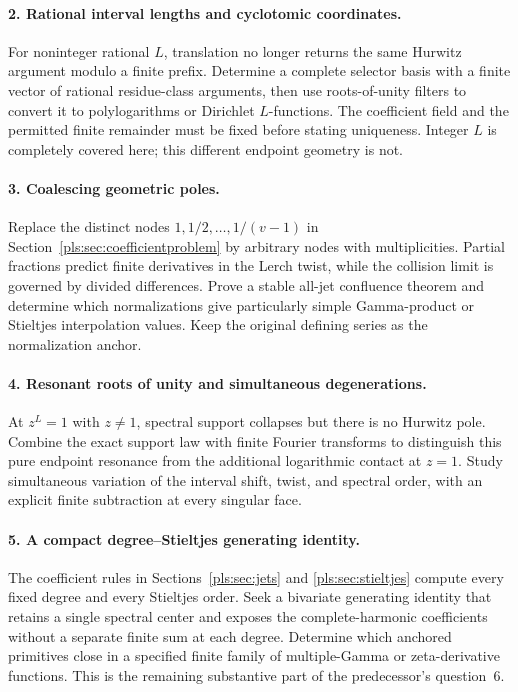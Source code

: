 \documentclass[11pt,letterpaper]{article}
\numberwithin{equation}{section}
\theoremstyle{definition}
\theoremstyle{remark}\newtheorem{remark}[theorem]{Remark}
\begin{document}
\paragraph{2. Rational interval lengths and cyclotomic coordinates.}
For noninteger rational $L$, translation no longer returns the same
Hurwitz argument modulo a finite prefix. Determine a complete selector
basis with a finite vector of rational residue-class arguments, then
use roots-of-unity filters to convert it to polylogarithms or Dirichlet
$L$-functions. The coefficient field and the permitted finite remainder
must be fixed before stating uniqueness. Integer $L$ is completely
covered here; this different endpoint geometry is not.

\paragraph{3. Coalescing geometric poles.}
Replace the distinct nodes $1,1/2,\ldots,1/(v-1)$ in
Section~\ref{pls:sec:coefficientproblem} by arbitrary nodes with
multiplicities. Partial fractions predict finite derivatives in the
Lerch twist, while the collision limit is governed by divided
differences. Prove a stable all-jet confluence theorem and determine
which normalizations give particularly simple Gamma-product or
Stieltjes interpolation values. Keep the original defining series as
the normalization anchor.

\paragraph{4. Resonant roots of unity and simultaneous degenerations.}
At $z^L=1$ with $z\ne1$, spectral support collapses but there is no
Hurwitz pole. Combine the exact support law with finite Fourier
transforms to distinguish this pure endpoint resonance from the
additional logarithmic contact at $z=1$. Study simultaneous variation
of the interval shift, twist, and spectral order, with an explicit
finite subtraction at every singular face.

\paragraph{5. A compact degree--Stieltjes generating identity.}
The coefficient rules in Sections~\ref{pls:sec:jets} and
\ref{pls:sec:stieltjes} compute every fixed degree and every Stieltjes
order. Seek a bivariate generating identity that retains a single
spectral center and exposes the complete-harmonic coefficients without
a separate finite sum at each degree. Determine which anchored
primitives close in a specified finite family of multiple-Gamma or
zeta-derivative functions. This is the remaining substantive part of
the predecessor's question~6.
\end{document}

